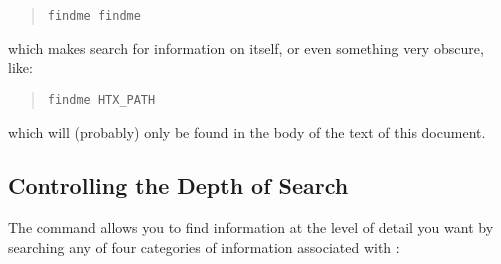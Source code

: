 \begin{quote}
\begin{verbatim}
findme findme
\end{verbatim}
\end{quote}

which makes  search for information on itself, or even
something very obscure, like:

\begin{quote}
\begin{verbatim}
findme HTX_PATH
\end{verbatim}
\end{quote}

which will (probably) only be found in the body of the text of this
document.

\subsection{\label{sect:depthofsearch}Controlling the Depth of Search}

The  command allows you to find information at
the level of detail you want by searching any of four categories of
information associated with :

